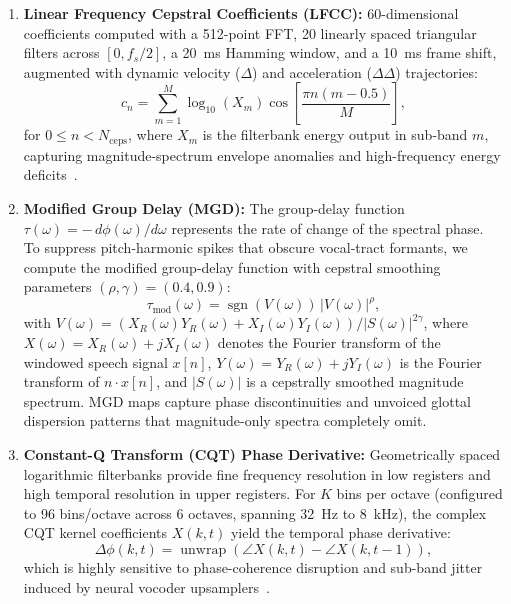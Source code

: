 \begin{enumerate}
\item \textbf{Linear Frequency Cepstral Coefficients (LFCC):} 60-dimensional coefficients computed with a 512-point FFT, 20 linearly spaced triangular filters across $[0, f_s/2]$, a 20~ms Hamming window, and a 10~ms frame shift, augmented with dynamic velocity ($\Delta$) and acceleration ($\Delta\Delta$) trajectories:
\begin{equation}
c_n = \sum_{m=1}^{M} \log_{10}(X_m) \cos\left[ \frac{\pi n (m - 0.5)}{M} \right],
\label{eq:lfcc}
\end{equation}
for $0 \le n < N_{\text{ceps}}$, where $X_m$ is the filterbank energy output in sub-band $m$, capturing magnitude-spectrum envelope anomalies and high-frequency energy deficits~\cite{sahidullah2015comparison}.

\item \textbf{Modified Group Delay (MGD):} The group-delay function $\tau(\omega) = -\,d\phi(\omega)/d\omega$ represents the rate of change of the spectral phase. To suppress pitch-harmonic spikes that obscure vocal-tract formants, we compute the modified group-delay function with cepstral smoothing parameters $(\rho, \gamma) = (0.4, 0.9)$:
\begin{equation}
\tau_{\text{mod}}(\omega) = \operatorname{sgn}(V(\omega)) \, |V(\omega)|^\rho,
\label{eq:mgd}
\end{equation}
with $V(\omega) = (X_R(\omega) Y_R(\omega) + X_I(\omega) Y_I(\omega)) / |S(\omega)|^{2\gamma}$, where $X(\omega) = X_R(\omega) + j X_I(\omega)$ denotes the Fourier transform of the windowed speech signal $x[n]$, $Y(\omega) = Y_R(\omega) + j Y_I(\omega)$ is the Fourier transform of $n \cdot x[n]$, and $|S(\omega)|$ is a cepstrally smoothed magnitude spectrum. MGD maps capture phase discontinuities and unvoiced glottal dispersion patterns that magnitude-only spectra completely omit.

\item \textbf{Constant-Q Transform (CQT) Phase Derivative:} Geometrically spaced logarithmic filterbanks provide fine frequency resolution in low registers and high temporal resolution in upper registers. For $K$ bins per octave (configured to 96 bins/octave across 6 octaves, spanning 32~Hz to 8~kHz), the complex CQT kernel coefficients $X(k, t)$ yield the temporal phase derivative:
\begin{equation}
\Delta \phi(k, t) = \operatorname{unwrap}\left( \angle X(k, t) - \angle X(k, t-1) \right),
\label{eq:cqt}
\end{equation}
which is highly sensitive to phase-coherence disruption and sub-band jitter induced by neural vocoder upsamplers~\cite{todisco2017constantq,frank2021wavefake}.
\end{enumerate}

